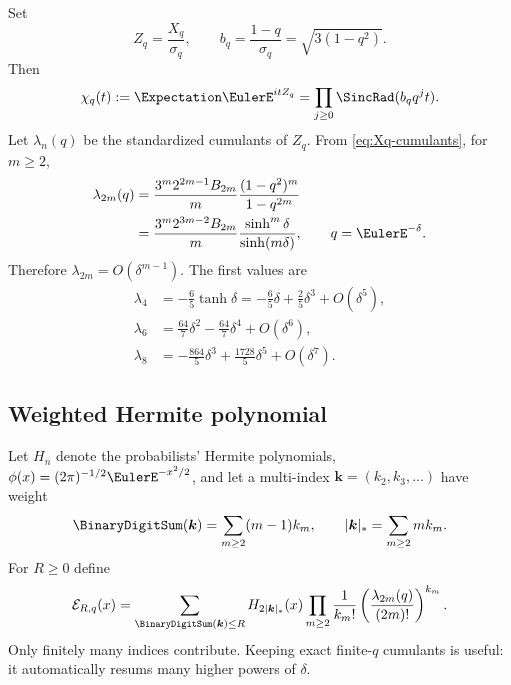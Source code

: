 \documentclass[11pt,a4paper]{article}
\theoremstyle{definition}
\begin{document}
Set
\begin{equation}
 Z_q=\frac{X_q}{\sigma_q},
 \qquad b_q=\frac{1-q}{\sigma_q}=\sqrt{3(1-q^2)}.
 \label{eq:Zq-bq}
\end{equation}
Then
\begin{equation}
 \chi_q(t):=\Expectation \EulerE^{itZ_q}
 =\prod_{j\ge0}\SincRad(b_qq^jt).
 \label{eq:standardized-cf}
\end{equation}
Let $\lambda_n(q)$ be the standardized cumulants of $Z_q$.  From
\eqref{eq:Xq-cumulants}, for $m\ge2$,
\begin{align}
 \lambda_{2m}(q)
 &=\frac{3^m2^{2m-1}B_{2m}}{m}
   \frac{(1-q^2)^m}{1-q^{2m}}
 \label{eq:lambda-q}\\
 &=\frac{3^m2^{3m-2}B_{2m}}{m}
   \frac{\sinh^m\delta}{\sinh(m\delta)},
 \qquad q=\EulerE^{-\delta}.
 \label{eq:lambda-delta}
\end{align}
Therefore $\lambda_{2m}=O(\delta^{m-1})$.  The first values are
\begin{align}
 \lambda_4&=-\frac65\tanh\delta
 =-\frac65\delta+\frac25\delta^3+O(\delta^5),
 \label{eq:lambda4}\\
 \lambda_6&=\frac{64}{7}\delta^2-\frac{64}{7}\delta^4+O(\delta^6),
 \label{eq:lambda6}\\
 \lambda_8&=-\frac{864}{5}\delta^3+\frac{1728}{5}\delta^5+O(\delta^7).
 \label{eq:lambda8}
\end{align}

\subsection{Weighted Hermite polynomial}

Let $H_n$ denote the probabilists' Hermite polynomials,
$\phi(x)=(2\pi)^{-1/2}\EulerE^{-x^2/2}$, and let a multi-index
$\bm{k}=(k_2,k_3,\ldots)$ have weight
\begin{equation}
 \BinaryDigitSum(\bm{k})=\sum_{m\ge2}(m-1)k_m,
 \qquad
 |\bm{k}|_*=\sum_{m\ge2}mk_m.
 \label{eq:edgeworth-weight}
\end{equation}
For $R\ge0$ define
\begin{equation}
 \mathcal E_{R,q}(x)=
 \sum_{\BinaryDigitSum(\bm{k})\le R}
 H_{2|\bm{k}|_*}(x)
 \prod_{m\ge2}\frac1{k_m!}
 \left(\frac{\lambda_{2m}(q)}{(2m)!}\right)^{k_m}.
 \label{eq:edgeworth-polynomial}
\end{equation}
Only finitely many indices contribute.  Keeping exact finite-$q$ cumulants is
useful: it automatically resums many higher powers of $\delta$.
\end{document}
